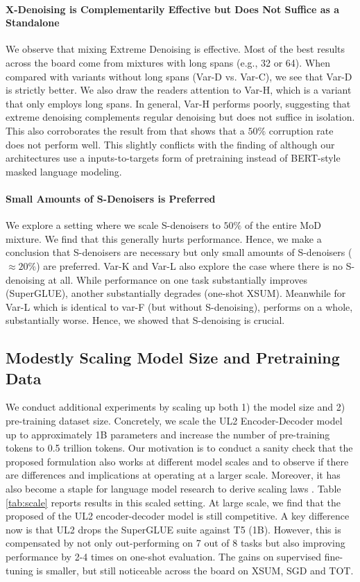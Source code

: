 \documentclass[10pt]{article}
\begin{document}
\paragraph{X-Denoising is Complementarily Effective but Does Not Suffice as a Standalone}
We observe that mixing Extreme Denoising is effective. Most of the best results across the board come from mixtures with long spans (e.g., 32 or 64). When compared with variants without long spans (Var-D vs. Var-C), we see that Var-D is strictly better. We also draw the readers attention to Var-H, which is a variant that only employs long spans. In general, Var-H performs poorly, suggesting that extreme denoising complements regular denoising but does not suffice in isolation. This also corroborates the result from \cite{raffel2019exploring} that shows that a $50\%$ corruption rate does not perform well. This slightly conflicts with the finding of \citep{wettig2022should} although our architectures use a inputs-to-targets form of pretraining instead of BERT-style masked language modeling. 

\paragraph{Small Amounts of S-Denoisers is Preferred} We explore a setting where we scale S-denoisers to $50\%$ of the entire MoD mixture. We find that this generally hurts performance. Hence, we make a conclusion that S-denoisers are necessary but only small amounts of S-denoisers ($\approx 20\%$) are preferred. Var-K and Var-L also explore the case where there is no S-denoising at all. While performance on one task substantially improves (SuperGLUE), another substantially degrades (one-shot XSUM). Meanwhile for Var-L which is identical to var-F (but without S-denoising), performs on a whole, substantially worse. Hence, we showed that S-denoising is crucial.



\subsection{Modestly Scaling Model Size and Pretraining Data}
We conduct additional experiments by scaling up both 1) the model size and 2) pre-training dataset size. Concretely, we scale the UL2 Encoder-Decoder model up to approximately 1B parameters and increase the number of pre-training tokens to 0.5 trillion tokens. Our motivation is to conduct a sanity check that the proposed formulation also works at different model scales and to observe if there are differences and implications at operating at a larger scale. Moreover, it has also become a staple for language model research to derive scaling laws \citep{kaplan2020scaling,tay2021scale}. Table \ref{tab:scale} reports results in this scaled setting. At large scale, we find that the proposed of the UL2 encoder-decoder model is still competitive. A key difference now is that UL2 drops the SuperGLUE suite against T5 (1B). However, this is compensated by not only out-performing on 7 out of 8 tasks but also improving performance by 2-4 times on one-shot evaluation. The gains on supervised fine-tuning is smaller, but still noticeable across the board on XSUM, SGD and TOT.
\end{document}
